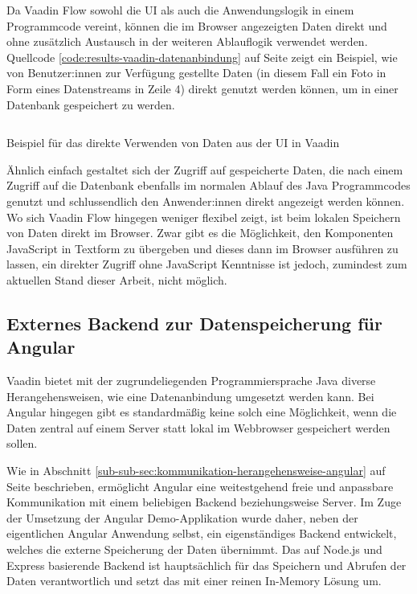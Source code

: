 \documentclass[a4paper,12pt,twoside]{scrreprt}
\begin{document}
\medskip

Da Vaadin Flow sowohl die \ac{UI} als auch die Anwendungslogik in einem Programmcode vereint, können die im Browser angezeigten Daten direkt und ohne zusätzlich Austausch in der weiteren Ablauflogik verwendet werden. Quellcode \ref{code:results-vaadin-datenanbindung} auf Seite \pageref{code:results-vaadin-datenanbindung} zeigt ein Beispiel, wie von Benutzer:innen zur Verfügung gestellte Daten (in diesem Fall ein Foto in Form eines Datenstreams in Zeile 4) direkt genutzt werden können, um in einer Datenbank gespeichert zu werden.

\begin{listing}[ht]
    \inputminted[fontsize=\footnotesize,linenos,breaklines]{java}{code/Luidold_Results-Vaadin-Datenanbindung-CodeSample.java}
    \caption[Beispiel für das direkte Verwenden von Daten aus der \ac{UI} in Vaadin]{Beispiel für das direkte Verwenden von Daten aus der \ac{UI} in Vaadin}
    \label{code:results-vaadin-datenanbindung}
\end{listing}

Ähnlich einfach gestaltet sich der Zugriff auf gespeicherte Daten, die nach einem Zugriff auf die Datenbank ebenfalls im normalen Ablauf des Java Programmcodes genutzt und schlussendlich den Anwender:innen direkt angezeigt werden können. Wo sich Vaadin Flow hingegen weniger flexibel zeigt, ist beim lokalen Speichern von Daten direkt im Browser. Zwar gibt es die Möglichkeit, den Komponenten JavaScript in Textform zu übergeben und dieses dann im Browser ausführen zu lassen, ein direkter Zugriff ohne JavaScript Kenntnisse ist jedoch, zumindest zum aktuellen Stand dieser Arbeit, nicht möglich.

\subsection{Externes Backend zur Datenspeicherung für Angular}
\label{sub-sec:result-datenanbindung-angular}
Vaadin bietet mit der zugrundeliegenden Programmiersprache Java diverse Herangehensweisen, wie eine Datenanbindung umgesetzt werden kann. Bei Angular hingegen gibt es standardmäßig keine solch eine Möglichkeit, wenn die Daten zentral auf einem Server statt lokal im Webbrowser gespeichert werden sollen.

\medskip

Wie in Abschnitt \ref{sub-sub-sec:kommunikation-herangehensweise-angular} auf Seite \pageref{sub-sub-sec:kommunikation-herangehensweise-angular} beschrieben, ermöglicht Angular eine weitestgehend freie und anpassbare Kommunikation mit einem beliebigen Backend beziehungsweise Server. Im Zuge der Umsetzung der Angular Demo-Applikation wurde daher, neben der eigentlichen Angular Anwendung selbst, ein eigenständiges Backend entwickelt, welches die externe Speicherung der Daten übernimmt. Das auf Node.js und Express basierende Backend ist hauptsächlich für das Speichern und Abrufen der Daten verantwortlich und setzt das mit einer reinen In-Memory Lösung um.
\end{document}
